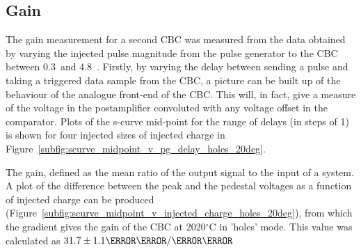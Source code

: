 \subsection{Gain}
\label{ss:gain}

The gain measurement for a second CBC was measured from the data obtained by varying the injected pulse
magnitude from the pulse generator to the CBC between 0.3~\fC and 4.8~\fC. Firstly, by varying the delay
between sending a pulse and taking a triggered data sample from the CBC, a picture can be built up of the
behaviour of the analogue front-end of the CBC. This will, in fact, give a measure of the voltage in the
postamplifier convoluted with any voltage offset in the comparator. Plots of the s-curve mid-point for the
range of delays (in steps of 1\ns) is shown for four injected sizes of injected charge in
Figure~\ref{subfig:scurve_midpoint_v_pg_delay_holes_20deg}.

The gain, defined as the mean ratio of the output signal to the input of a system. A plot of the difference
between the peak and the pedestal voltages as a function of injected charge can be produced
(Figure~\ref{subfig:scurve_midpoint_v_injected_charge_holes_20deg}), from which the gradient gives the gain of
the CBC at 2020$^{\circ}$C in 'holes' mode. This value was calculated as $31.7\pm1.1\mathrm{\mV/\fC}$


